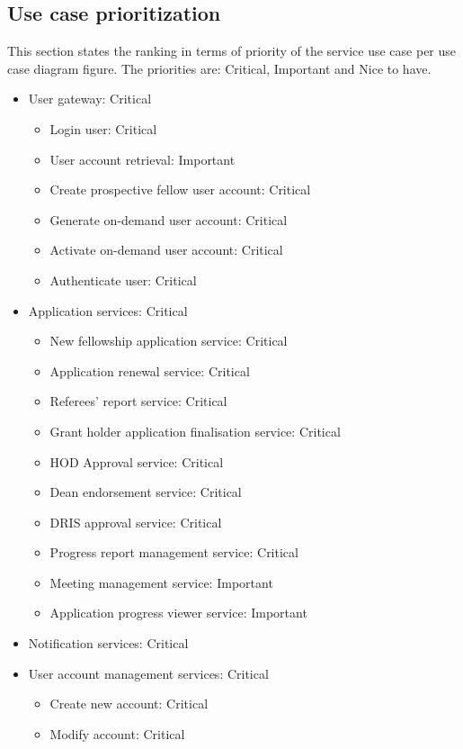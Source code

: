 \documentclass[12pt]{article}
\begin{document}
\subsection{Use case prioritization}
\vspace{0.2in}
This section states the ranking in terms of priority of the service use case per use case diagram figure. The priorities are: Critical, Important and Nice to have.\\ 
\begin{itemize}
	\item User gateway: Critical
	\begin{itemize}
		\item Login user: Critical
		\item User account retrieval: Important
		\item Create prospective fellow user account: Critical
		\item Generate on-demand user account: Critical
		\item Activate on-demand user account: Critical
		\item Authenticate user: Critical
	\end{itemize}
	\item Application services: Critical
	\begin{itemize}
		\item New fellowship application service: Critical
		\item Application renewal service: Critical
		\item Referees' report service: Critical
		\item Grant holder application finalisation service: Critical
		\item HOD Approval service: Critical
		\item Dean endorsement service: Critical
		\item DRIS approval service: Critical
		\item Progress report management service: Critical		
		\item Meeting management service: Important
		\item Application progress viewer service: Important		
	\end{itemize}
	\item Notification services: Critical
	\item User account management services: Critical
	\begin{itemize}
		\item Create new account: Critical
		\item Modify account: Critical

\end{itemize}
\end{itemize}
\end{document}

